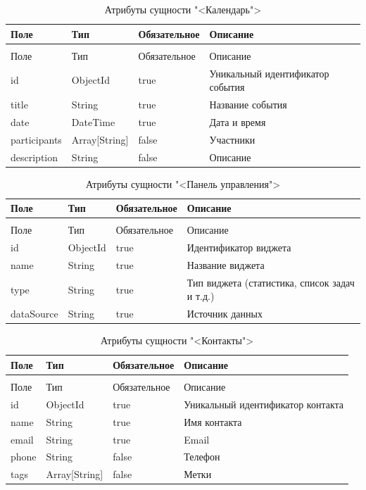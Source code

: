 \begin{xltabular}{\textwidth}{|l|l|p{3.2cm}|X|}
  \caption{Атрибуты сущности "<Календарь">\label{calendar:table}}\\ \hline
  Поле & Тип & Обязательное & Описание \\ \hline
  \endfirsthead
  \\ \hline
  Поле & Тип & Обязательное & Описание \\ \hline
  \endhead
  id & ObjectId & true & Уникальный идентификатор события \\ \hline
  title & String & true & Название события \\ \hline
  date & DateTime & true & Дата и время \\ \hline
  participants & Array[String] & false & Участники \\ \hline
  description & String & false & Описание \\ \hline
\end{xltabular}

\begin{xltabular}{\textwidth}{|l|l|p{3.2cm}|X|}
  \caption{Атрибуты сущности "<Панель управления">\label{dashboard:table}}\\ \hline
  Поле & Тип & Обязательное & Описание \\ \hline
  \endfirsthead
  \\ \hline
  Поле & Тип & Обязательное & Описание \\ \hline
  \endhead
  id & ObjectId & true & Идентификатор виджета \\ \hline
  name & String & true & Название виджета \\ \hline
  type & String & true & Тип виджета (статистика, список задач и т.д.) \\ \hline
  dataSource & String & true & Источник данных \\ \hline
\end{xltabular}

\begin{xltabular}{\textwidth}{|l|l|p{3.2cm}|X|}
  \caption{Атрибуты сущности "<Контакты">\label{contacts:table}}\\ \hline
  Поле & Тип & Обязательное & Описание \\ \hline
  \endfirsthead
  \\ \hline
  Поле & Тип & Обязательное & Описание \\ \hline
  \endhead
  id & ObjectId & true & Уникальный идентификатор контакта \\ \hline
  name & String & true & Имя контакта \\ \hline
  email & String & true & Email \\ \hline
  phone & String & false & Телефон \\ \hline
  tags & Array[String] & false & Метки \\ \hline
\end{xltabular}


